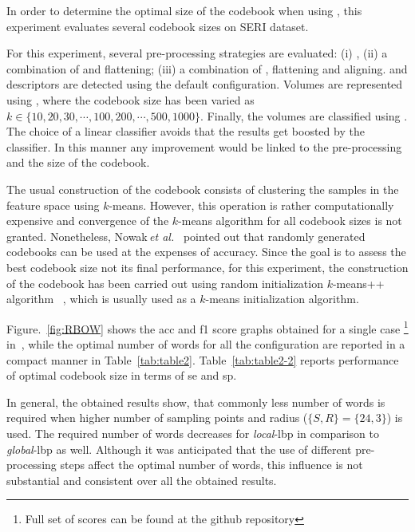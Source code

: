 In order to determine the optimal size of the codebook when using \bow, this experiment evaluates several codebook sizes on SERI dataset.

For this experiment, several pre-processing strategies are evaluated: (i) \nlm, (ii) a combination of \nlm and flattening; (iii) a combination of \nlm, flattening and aligning.
\lbp and \lbptop descriptors are detected using the default configuration.
Volumes are represented using \bow, where the codebook size has been varied as $k \in \{10, 20, 30, \cdots, 100, 200, \cdots, 500, 1000\}$.
Finally, the volumes are classified using \lr.
The choice of a linear classifier avoids that the results get boosted by the classifier. In this manner any improvement would be linked to the pre-processing and the size of the codebook.




The usual construction of the codebook consists of clustering the samples in
the feature space using $k$-means. However, this operation is rather
computationally expensive and convergence of the $k$-means algorithm for all
codebook sizes is not granted.
Nonetheless, Nowak\,\textit{et al.}~\cite{nowak2006sampling} pointed out that randomly generated codebooks can be used at the expenses of accuracy.
Since the goal is to assess the best codebook size not its final performance, for this experiment, the construction of the codebook has been carried out using random initialization $k$-means++ algorithm ~\cite{arthur2007k}, which is usually used as a $k$-means initialization algorithm.

Figure.~\ref{fig:RBOW} shows the \ac{acc} and \ac{f1} score graphs obtained for a single case \footnote{Full set of scores can be found at the github repository} in~\cite{Lemaitre2015}, while the optimal number of words for all the configuration are reported in a compact manner in Table~\ref{tab:table2}.
Table~\ref{tab:table2-2} reports performance of optimal codebook size in terms of \ac{se} and \ac{sp}.

In general, the obtained results show, that commonly less number of words is required when higher number of sampling points and radius ($\{S,R\} = \{24,3\}$) is used.
The required number of words decreases for \emph{local}-\ac{lbp} in comparison to \emph{global}-\ac{lbp} as well.
Although it was anticipated that the use of different pre-processing steps affect the optimal number of words, this influence is not substantial and consistent over all the obtained results.


